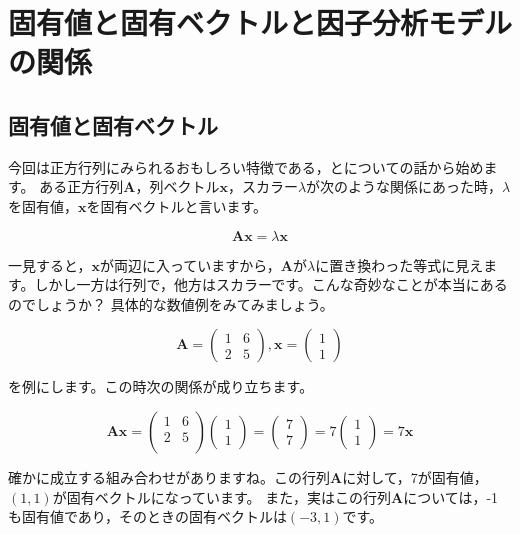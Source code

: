 \documentclass{ltjsbook}
\begin{document}
\chapter{固有値と固有ベクトルと因子分析モデルの関係}
\label{x08_eigen}

\section{固有値と固有ベクトル}
今回は正方行列にみられるおもしろい特徴である，とについての話から始めます。
ある正方行列$\bm{A}$，列ベクトル$\bm{x}$，スカラー$\lambda$が次のような関係にあった時，$\lambda$を固有値，$\bm{x}$を固有ベクトルと言います。

\[ \bm{Ax} = \lambda\bm{x} \]

一見すると，$\bm{x}$が両辺に入っていますから，$\bm{A}$が$\lambda$に置き換わった等式に見えます。しかし一方は行列で，他方はスカラーです。こんな奇妙なことが本当にあるのでしょうか？
具体的な数値例をみてみましょう。

\[
	\bm{A} = \begin{pmatrix}
		1 & 6 \\ 2 & 5
	\end{pmatrix}
	,\bm{x} = \begin{pmatrix}
		1 \\ 1
	\end{pmatrix}
\]

を例にします。この時次の関係が成り立ちます。

\[
	\bm{Ax} =
	\begin {pmatrix}
	1 & 6 \\
	2 & 5 \\
	\end{pmatrix}
	\begin{pmatrix}
		1 \\ 1
	\end{pmatrix}
	=
	\begin{pmatrix}
		7 \\ 7
	\end{pmatrix}
	=7
	\begin{pmatrix}
		1 \\ 1
	\end{pmatrix}
	=7 \bm{x}
\]

確かに成立する組み合わせがありますね。この行列$\bm{A}$に対して，7が固有値，$(1,1)$が固有ベクトルになっています。
また，実はこの行列$\bm{A}$については，-1も固有値であり，そのときの固有ベクトルは$(-3,1)$です。
\end{document}
